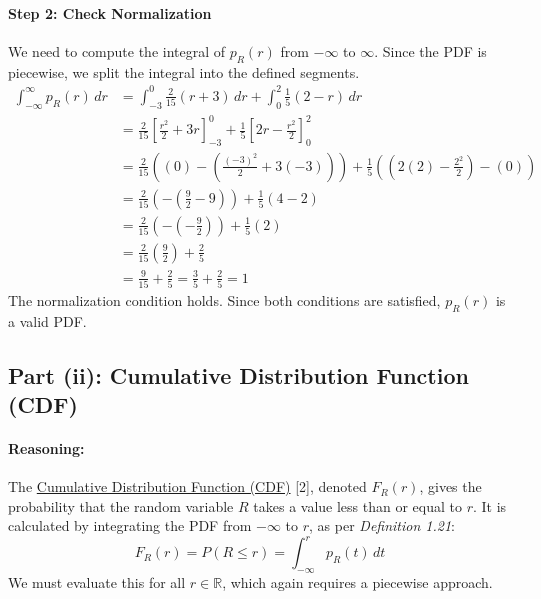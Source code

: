 \documentclass[11pt,a4paper]{article}
\newcommand{\concept}[2]{\hyperlink{note:#1}{#2}}
\begin{document}
\paragraph{Step 2: Check Normalization}
We need to compute the integral of $p_R(r)$ from $-\infty$ to $\infty$. Since the PDF is piecewise, we split the integral into the defined segments.
\begin{align*}
    \int_{-\infty}^{\infty} p_R(r) \,dr &= \int_{-3}^{0} \frac{2}{15}(r+3) \,dr + \int_{0}^{2} \frac{1}{5}(2-r) \,dr \\
    &= \frac{2}{15} \left[ \frac{r^2}{2} + 3r \right]_{-3}^{0} + \frac{1}{5} \left[ 2r - \frac{r^2}{2} \right]_{0}^{2} \\
    &= \frac{2}{15} \left( (0) - \left(\frac{(-3)^2}{2} + 3(-3)\right) \right) + \frac{1}{5} \left( \left(2(2) - \frac{2^2}{2}\right) - (0) \right) \\
    &= \frac{2}{15} \left( - \left(\frac{9}{2} - 9\right) \right) + \frac{1}{5} \left( 4 - 2 \right) \\
    &= \frac{2}{15} \left( - \left(-\frac{9}{2}\right) \right) + \frac{1}{5} (2) \\
    &= \frac{2}{15} \left(\frac{9}{2}\right) + \frac{2}{5} \\
    &= \frac{9}{15} + \frac{2}{5} = \frac{3}{5} + \frac{2}{5} = 1
\end{align*}
The normalization condition holds. Since both conditions are satisfied, $p_R(r)$ is a valid PDF.

\subsection{Part (ii): Cumulative Distribution Function (CDF)}
\paragraph{Reasoning:}
The \concept{cdf}{Cumulative Distribution Function (CDF)} [2], denoted $F_R(r)$, gives the probability that the random variable $R$ takes a value less than or equal to $r$. It is calculated by integrating the PDF from $-\infty$ to $r$, as per \textit{Definition 1.21}:
\[ F_R(r) = P(R \le r) = \int_{-\infty}^{r} p_R(t) \,dt \]
We must evaluate this for all $r \in \mathbb{R}$, which again requires a piecewise approach.
\end{document}

